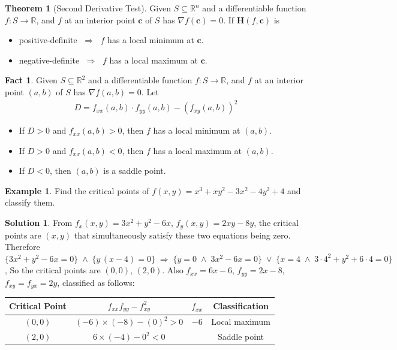 \documentclass[10pt]{extarticle}
\newcommand{\ds}{\displaystyle}
\newcommand{\ie}{\;\Longrightarrow\;}
\newcommand{\orr}{\;\vee\;}
\newcommand{\andd}{\;\wedge\;}
\theoremstyle{definition}
\newtheorem*{thm}{Theorem}
\newtheorem*{ex}{Example}
\newtheorem*{sol}{Solution}
\newtheorem*{fact}{Fact}
\newcommand{\vc}{\mathbf{c}}
\newcommand{\vH}{\mathbf{H}}
\begin{document}
\newpage

\begin{thm}[Second Derivative Test]
  Given $\ds S\subseteq\mathbb{R}^n$ and a differentiable function $\ds f:S\to\mathbb{R}$, and $f$ at an interior point $\vc$ of $S$ has $\ds\nabla f(\vc) = 0$. If $\vH(f, \vc)$ is  
  \begin{itemize}%
    \item positive-definite $\ie$ $f$ has a local minimum at $\vc$. 
    \item negative-definite $\ie$ $f$ has a local maximum at $\vc$. 
  \end{itemize}
\end{thm}

\begin{fact}
  Given $\ds S\subseteq\mathbb{R}^2$ and a differentiable function $\ds f:S\to\mathbb{R}$, and $f$ at an interior point $(a, b)$ of $S$ has $\ds\nabla f(a, b) = 0$. Let 
  \begin{align*}
    D = f_{xx}(a, b)\cdot f_{yy}(a, b) - (f_{xy}(a, b))^2
  \end{align*}
  \begin{itemize}%
    \item If $D > 0$ and $\ds f_{xx}(a, b) > 0$, then $f$ has a local minimum at $(a, b)$. 
    \item If $D > 0$ and $\ds f_{xx}(a, b) < 0$, then $f$ has a local maximum at $(a, b)$. 
    \item If $D < 0$, then $(a, b)$ is a saddle point. 
  \end{itemize}
\end{fact}

\newpage

\begin{ex} 
  Find the critical points of $\ds f(x, y) = x^3 + xy^2 - 3x^2 - 4y^2 + 4$ and classify them. 
\end{ex}

\begin{sol} From $\ds f_x(x, y) = 3x^2 + y^2 - 6x$, $\ds f_y(x, y) = 2xy - 8y$, the critical points are $(x, y)$ that simultaneously satisfy these two equations being zero. Therefore $\ds\big\{3x^2 + y^2 - 6x = 0\big\}\andd\big\{y\,(x - 4) = 0\big\} \ie \big\{y = 0\andd 3x^2 - 6x = 0\big\}\orr\big\{x = 4\andd 3\cdot 4^2 + y^2 + 6\cdot 4 = 0\big\}$, So the critical points are $(0, 0)$, $(2, 0)$. Also $\ds f_{xx} = 6x - 6$, $\ds f_{yy} = 2x - 8$, $\ds f_{xy} = f_{yx} = 2y$, classified as follows: 
  \begin{center}
  \begin{tabular}{cccc}
    \toprule
    Critical Point   & $f_{xx}f_{yy}-f_{xy}^2$ & $f_{xx}$ & Classification \\    
    \midrule
    $(0, 0)$ & $(-6)\times(-8) - (0)^2 > 0$ & $-6$ & Local maximum \\ 
    $(2, 0)$ & $6\times(-4) - 0^2 < 0$      &      & Saddle point \\ \bottomrule
  \end{tabular}
  \end{center}
\end{sol}
\end{document}
